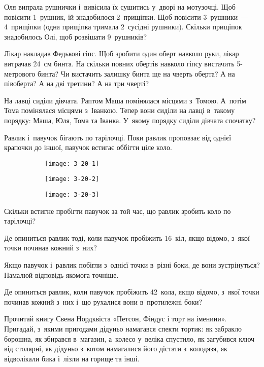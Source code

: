 \problem
Оля випрала рушнички і~вивісила їх сушитись у~дворі на мотузочці.
Щоб повісити 1~рушник, їй знадобилося 2~прищіпки.
Щоб повісити 3~рушники~--- 4~прищіпки (одна прищіпка тримала 2~сусідні рушники).
Скільки прищіпок знадобилось Олі, щоб розвішати 9~рушників?


\problem
Лікар накладав Федькові гіпс.
Щоб зробити один оберт навколо руки, лікар витрачав 24~см бинта.
На скільки повних обертів навколо гіпсу вистачить 5-метрового бинта?
Чи вистачить залишку бинта ще на чверть оберта?
А на півоберта?
А на дві третини?
А на три чверті?


\problem
На лавці сиділи дівчата. Раптом Маша помінялася місцями з~Томою.
А~потім Тома помінялася місцями з~Іванкою.
Тепер вони сиділи на лавці в~такому порядку: Маша, Юля, Тома та Іванка.
У~якому порядку сиділи дівчата спочатку?


\problem
{}
Равлик і~павучок бігають по тарілочці.
Поки равлик проповзає від однієї крапочки до іншої,
павучок встигає оббігти ціле коло.

\begin{figure}[ht]
    \centering
    \begin{subfigure}{0.2\textwidth}
        \texttt{[image: 3-20-1]}
    \end{subfigure}
    \quad
    \begin{subfigure}{0.4\textwidth}
        \texttt{[image: 3-20-2]}
    \end{subfigure}
    \quad
    \begin{subfigure}{0.2\textwidth}
        \texttt{[image: 3-20-3]}
    \end{subfigure}
\end{figure}

Скільки встигне пробігти павучок за той час,
що равлик зробить коло по тарілочці?

Де опиниться равлик тоді, коли павучок пробіжить 16~кіл,
якщо відомо, з~якої точки починав кожний з~них?

Якщо павучок і~равлик побігли з~однієї точки в~різні боки,
де вони зустрінуться?
Намалюй відповідь якомога точніше.

Де опиниться равлик, коли павучок пробіжить 42~кола, якщо відомо,
з~якої точки починав кожний з~них і~що рухалися вони в~протилежні боки?


\problem
Прочитай книгу Свена Нордквіста «Петсон, Фіндус і торт на іменини». Пригадай,
з~якими пригодами дідуньо намагався спекти тортик: як забракло борошна,
як збирався в~магазин, а~колесо у~веліка спустило, як загубився ключ
від столярні, як дідуньо з~котом намагалися його дістати з~колодязя,
як відволікали бика і~лізли на горище та інші.

